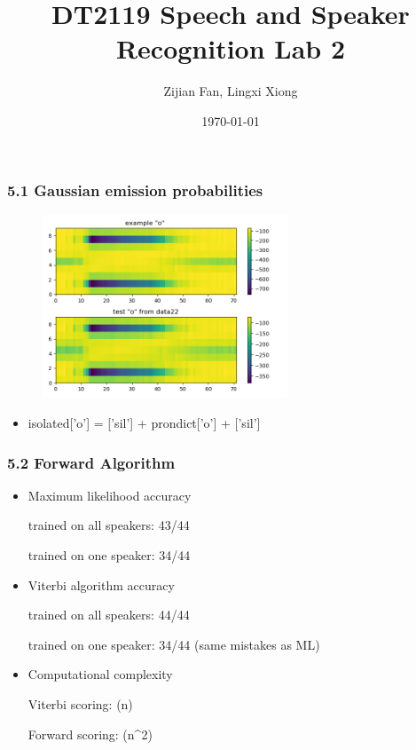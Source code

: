 \documentclass[t]{beamer}
\title
	{DT2119 Speech and Speaker Recognition Lab 2
	}
\author[Zifan, Lingxi]
	{
	Zijian Fan, Lingxi Xiong
	}
\institute{}
\date{}
\date{\today}
\begin{document}
	
\begin{frame}
	\titlepage
\end{frame}
	
\begin{frame}
	\frametitle{5.1 Gaussian emission probabilities}
	\begin{figure}
\centering
		\includegraphics[width=0.65\textwidth]{figures/51.png}
	\end{figure}
			
	\begin{itemize}
		\item  isolated['o'] = ['sil'] + prondict['o'] + ['sil']
	\end{itemize}
\end{frame}
	
\begin{frame}
	\frametitle{5.2 Forward Algorithm}
	\begin{itemize}
		\item Maximum likelihood accuracy
		
trained on all speakers: 43/44

trained on one speaker: 34/44\\


		\item Viterbi algorithm accuracy

trained on all speakers: 44/44

trained on one speaker: 34/44 (same mistakes as ML)


\item Computational complexity

Viterbi scoring: (n)

Forward scoring: (n^2)

	\end{itemize}
\end{frame}
	
\end{document}
